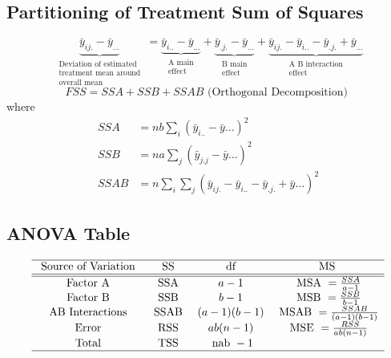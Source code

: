 \documentclass[11pt,a4paper]{article}
\begin{document}
\subsection{Partitioning of Treatment Sum of Squares}
$$\underbrace{\bar{y}_{i j.}-\bar{y}_{...}}_{\begin{array}{c}\text { Deviation of estimated } \\ \text { treatment mean around } \\ \text { overall mean }\end{array}}=\underbrace{\bar{y}_{i . .}-\bar{y}_{...}}_{\begin{array}{c}\text { A main } \\ \text { effect }\end{array}}+\underbrace{\bar{y} _{.j.}-\bar{y}_{...}}_{\begin{array}{c}\text { B main } \\ \text { effect }\end{array}}+\underbrace{\bar{y}_{i j.}-\bar{y}_{i . .}-\bar{y} _{.j.}+\bar{y} _{...}}_{\begin{array}{c}\text { A B interaction } \\ \text { effect }\end{array}}$$
$$
F S S=S S A+S S B+S S A B \text { (Orthogonal Decomposition) }
$$
where
$$
\begin{aligned}
S S A &=n b \sum_{i}\left(\bar{y}_{i . .}-\bar{y} \ldots\right)^{2} \\
S S B &=n a \sum_{j}\left(\bar{y}_{j . j}-\bar{y} \ldots\right)^{2} \\
S S A B &=n \sum_{i} \sum_{j}\left(\bar{y}_{i j .}-\bar{y}_{i . .}-\bar{y}_{. j .}+\bar{y} \ldots\right)^{2}
\end{aligned}
$$

\subsection{ANOVA Table}
\begin{equation}
    \begin{array}{cccc}
    \hline \text { Source of Variation } & \text { SS } & \text { df } & \text { MS } \\
    \hline \hline \text { Factor A } & \text { SSA } & a-1 & \text { MSA }=\frac{S S A}{a-1} \\
    \text { Factor B } & \text { SSB } & b-1 & \text { MSB }=\frac{S S B}{b-1} \\
    \text { AB Interactions } & \text { SSAB } & (a-1)(b-1) & \text { MSAB }=\frac{S S A B}{(a-1)(b-1)} \\
    \text { Error } & \text { RSS } & a b(n-1) & \text { MSE }=\frac{R S S}{a b(n-1)} \\
    \text { Total } & \text { TSS } & \text { nab }-1 & \\
    \hline
    \end{array}
    \nonumber
\end{equation}
\end{document}
